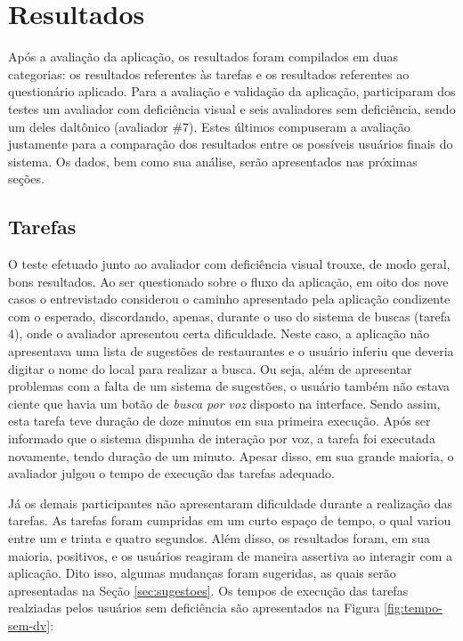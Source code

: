 \chapter{\label{chap:resultados}Resultados}

Após a avaliação da aplicação, os resultados foram compilados em duas categorias: os resultados referentes às tarefas e os resultados referentes ao questionário aplicado. Para a avaliação e validação da aplicação, participaram dos testes um avaliador com deficiência visual e seis avaliadores sem deficiência, sendo um deles daltônico (avaliador \#7). Estes últimos compuseram a avaliação justamente para a comparação dos resultados entre os possíveis usuários finais do sistema. Os dados, bem como sua análise, serão apresentados nas próximas seções.

\section{Tarefas}

O teste efetuado junto ao avaliador com deficiência visual trouxe, de modo geral, bons resultados. Ao ser questionado sobre o fluxo da aplicação, em oito dos nove casos o entrevistado considerou o caminho apresentado pela aplicação condizente com o esperado, discordando, apenas, durante o uso do sistema de buscas (tarefa 4), onde o avaliador apresentou certa dificuldade. Neste caso, a aplicação não apresentava uma lista de sugestões de restaurantes e o usuário inferiu que deveria digitar o nome do local para realizar a busca. Ou seja, além de apresentar problemas com a falta de um sistema de sugestões, o usuário também não estava ciente que havia um botão de \emph{busca por voz} disposto na interface. Sendo assim, esta tarefa teve duração de doze minutos em sua primeira execução. Após ser informado que o sistema dispunha de interação por voz, a tarefa foi executada novamente, tendo duração de um minuto. Apesar disso, em sua grande maioria, o avaliador julgou o tempo de execução das tarefas adequado.

Já os demais participantes não apresentaram dificuldade durante a realização das tarefas. As tarefas foram cumpridas em um curto espaço de tempo, o qual variou entre um e trinta e quatro segundos. Além disso, os resultados foram, em sua maioria, positivos, e os usuários reagiram de maneira assertiva ao interagir com a aplicação. Dito isso, algumas mudanças foram sugeridas, as quais serão apresentadas na Seção \ref{sec:sugestoes}. Os tempos de execução das tarefas realziadas pelos usuários sem deficiência são apresentados na Figura \ref{fig:tempo-sem-dv}:

